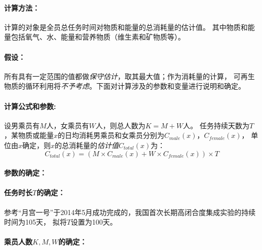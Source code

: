 \documentclass[a4paper]{standalone}
\begin{document}
\newcommand{\MaleConsume}[1][x]{C_{male}(#1)}
\newcommand{\FemaleConsume}[1][x]{C_{female}(#1)}
\newcommand{\TotalConsume}[1][x]{C_{total}(#1)}
\def\Average{C_{average}}
\def\GenderRatio{7/3}
\def\TotalDays{100}
\def\TotalCrews{10}
\def\MaleNumer{7}
\def\FemaleNumber{3}
\def\MaleConsumeEq{%
  \frac{\alpha}{1+\alpha} \times \Average
}
\def\FemaleConsumeEq{%
  \frac{1}{1+\alpha} \times \Average
}

\paragraph{计算方法：}
\label{apx:nutrition:begin}

计算的对象是全员总任务时间对物质和能量的总消耗量的估计值。
其中物质和能量包括氧气、水、能量和营养物质（维生素和矿物质等）。

\paragraph{假设：}

所有具有一定范围的值都做\emph{保守估计}，取其最大值；作为消耗量的计算，
可再生物质的循环利用将\emph{不予考虑}。下面对计算涉及的参数和变量进行说明和确定。

\paragraph{计算公式和参数:}

设男乘员有$M$人，女乘员有$W$人，则总人数为$K=M+W$人。
任务持续天数为$T$，某物质或能量$x$的日均消耗男乘员和女乘员分别为$\MaleConsume$，$\FemaleConsume$，
单位由$x$确定，则$x$的总消耗量的\emph{估计值}$\TotalConsume$为：
\begin{equation}
  \TotalConsume = (M \times \MaleConsume + W \times \FemaleConsume) \times T
\end{equation}

\paragraph{参数的确定：}

\paragraph{任务时长$T$的确定：}

参考“月宫一号”于2014年5月成功完成的，我国首次长期高闭合度集成实验的持续时间为105天\cite{月宫一号}，
拟将$T$设置为\TotalDays 天。

\paragraph{乘员人数$K,M,W$的确定：}
\end{document}
